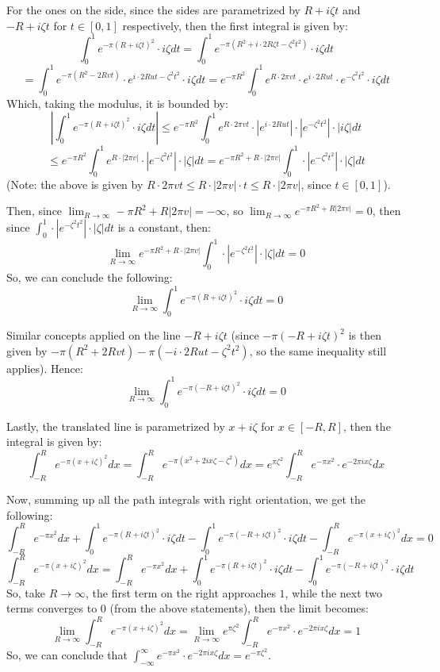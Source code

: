 \documentclass{article}
\begin{document}
\begin{itemize}
    For the ones on the side, since the sides are parametrized by $R+i\zeta t$ and $-R+i\zeta t$ for $t\in[0,1]$ respectively, then the first integral is given by:
    $$\int_{0}^{1}e^{-\pi(R+i\zeta t)^2}\cdot i\zeta dt = \int_{0}^{1}e^{-\pi(R^2+i\cdot 2R\zeta t-\zeta^2t^2)}\cdot i\zeta dt$$
    $$=\int_{0}^{1}e^{-\pi(R^2-2Rvt)}\cdot e^{i\cdot 2Rut-\zeta^2t^2}\cdot i\zeta dt=e^{-\pi R^2}\int_{0}^{1}e^{R\cdot 2\pi vt}\cdot e^{i\cdot 2Rut}\cdot e^{-\zeta^2t^2}\cdot i\zeta dt$$
    Which, taking the modulus, it is bounded by:
    $$\left|\int_{0}^{1}e^{-\pi(R+i\zeta t)^2}\cdot i\zeta dt\right| \leq e^{-\pi R^2}\int_{0}^{1}e^{R\cdot 2\pi vt}\cdot |e^{i\cdot 2Rut}|\cdot |e^{-\zeta^2t^2}|\cdot |i\zeta| dt$$
    $$\leq e^{-\pi R^2}\int_{0}^{1}e^{R\cdot |2\pi v|}\cdot |e^{-\zeta^2t^2}|\cdot |\zeta| dt = e^{-\pi R^2+R\cdot |2\pi v|}\int_{0}^{1}\cdot |e^{-\zeta^2t^2}|\cdot |\zeta| dt$$
    (Note: the above is given by $R\cdot 2\pi vt \leq R\cdot |2\pi v|\cdot t \leq R\cdot|2\pi v|$, since $t\in [0,1]$).

    Then, since $\lim_{R\rightarrow\infty}-\pi R^2+R|2\pi v| = -\infty$, so $\lim_{R\rightarrow\infty}e^{-\pi R^2+R|2\pi v|}=0$, then since $\int_{0}^{1}\cdot |e^{-\zeta^2t^2}|\cdot |\zeta| dt$ is a constant, then:
    $$\lim_{R\rightarrow\infty}e^{-\pi R^2+R\cdot |2\pi v|}\int_{0}^{1}\cdot |e^{-\zeta^2t^2}|\cdot |\zeta| dt = 0$$
    So, we can conclude the following:
    $$\lim_{R\rightarrow\infty}\int_{0}^{1}e^{-\pi(R+i\zeta t)^2}\cdot i\zeta dt = 0$$

    Similar concepts applied on the line $-R+i\zeta t$ (since $-\pi(-R+i\zeta t)^2$ is then given by $-\pi(R^2+2Rvt)-\pi(-i\cdot 2Rut-\zeta^2t^2)$, so the same inequality still applies).
    Hence: 
    $$\lim_{R\rightarrow\infty}\int_{0}^{1}e^{-\pi(-R+i\zeta t)^2}\cdot i\zeta dt = 0$$

    \hfil

    Lastly, the translated line is parametrized by $x+i\zeta$ for $x\in [-R,R]$, then the integral is given by:
    $$\int_{-R}^{R}e^{-\pi(x+i\zeta)^2}dx = \int_{-R}^{R}e^{-\pi(x^2+2ix\zeta - \zeta^2)}dx = e^{\pi\zeta^2}\int_{-R}^{R}e^{-\pi x^2}\cdot e^{-2\pi ix\zeta}dx$$
    
    \hfil

    Now, summing up all the path integrals with right orientation, we get the following:
    $$\int_{-R}^{R}e^{-\pi x^2}dx+\int_{0}^{1}e^{-\pi(R+i\zeta t)^2}\cdot i\zeta dt -\int_{0}^{1}e^{-\pi(-R+i\zeta t)^2}\cdot i\zeta dt-\int_{-R}^{R}e^{-\pi(x+i\zeta)^2}dx=0$$
    $$\int_{-R}^{R}e^{-\pi(x+i\zeta)^2}dx=\int_{-R}^{R}e^{-\pi x^2}dx+\int_{0}^{1}e^{-\pi(R+i\zeta t)^2}\cdot i\zeta dt -\int_{0}^{1}e^{-\pi(-R+i\zeta t)^2}\cdot i\zeta dt$$
    So, take $R\rightarrow\infty$, the first term on the right approaches $1$, while the next two terms converges to $0$ (from the above statements), then the limit becomes:
    $$\lim_{R\rightarrow\infty}\int_{-R}^{R}e^{-\pi(x+i\zeta)^2}dx = \lim_{R\rightarrow\infty}e^{\pi\zeta^2}\int_{-R}^{R}e^{-\pi x^2}\cdot e^{-2\pi ix\zeta}dx = 1$$
    So, we can conclude that $\int_{-\infty}^{\infty}e^{-\pi x^2}\cdot e^{-2\pi ix\zeta}dx = e^{-\pi\zeta^2}$.


\end{itemize}
\end{document}
